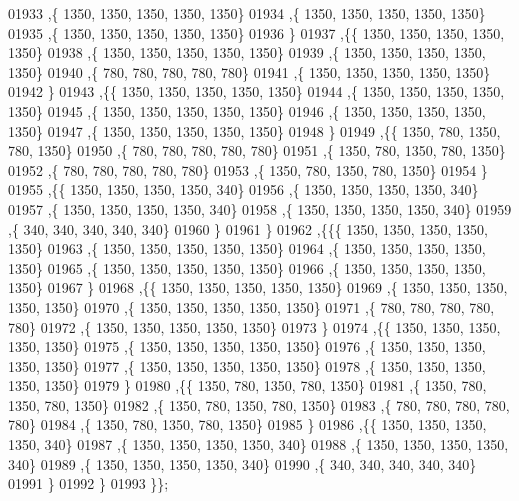 \begin{DoxyCode}
01933    ,\{  1350,  1350,  1350,  1350,  1350\}
01934    ,\{  1350,  1350,  1350,  1350,  1350\}
01935    ,\{  1350,  1350,  1350,  1350,  1350\}
01936    \}
01937   ,\{\{  1350,  1350,  1350,  1350,  1350\}
01938    ,\{  1350,  1350,  1350,  1350,  1350\}
01939    ,\{  1350,  1350,  1350,  1350,  1350\}
01940    ,\{   780,   780,   780,   780,   780\}
01941    ,\{  1350,  1350,  1350,  1350,  1350\}
01942    \}
01943   ,\{\{  1350,  1350,  1350,  1350,  1350\}
01944    ,\{  1350,  1350,  1350,  1350,  1350\}
01945    ,\{  1350,  1350,  1350,  1350,  1350\}
01946    ,\{  1350,  1350,  1350,  1350,  1350\}
01947    ,\{  1350,  1350,  1350,  1350,  1350\}
01948    \}
01949   ,\{\{  1350,   780,  1350,   780,  1350\}
01950    ,\{   780,   780,   780,   780,   780\}
01951    ,\{  1350,   780,  1350,   780,  1350\}
01952    ,\{   780,   780,   780,   780,   780\}
01953    ,\{  1350,   780,  1350,   780,  1350\}
01954    \}
01955   ,\{\{  1350,  1350,  1350,  1350,   340\}
01956    ,\{  1350,  1350,  1350,  1350,   340\}
01957    ,\{  1350,  1350,  1350,  1350,   340\}
01958    ,\{  1350,  1350,  1350,  1350,   340\}
01959    ,\{   340,   340,   340,   340,   340\}
01960    \}
01961   \}
01962  ,\{\{\{  1350,  1350,  1350,  1350,  1350\}
01963    ,\{  1350,  1350,  1350,  1350,  1350\}
01964    ,\{  1350,  1350,  1350,  1350,  1350\}
01965    ,\{  1350,  1350,  1350,  1350,  1350\}
01966    ,\{  1350,  1350,  1350,  1350,  1350\}
01967    \}
01968   ,\{\{  1350,  1350,  1350,  1350,  1350\}
01969    ,\{  1350,  1350,  1350,  1350,  1350\}
01970    ,\{  1350,  1350,  1350,  1350,  1350\}
01971    ,\{   780,   780,   780,   780,   780\}
01972    ,\{  1350,  1350,  1350,  1350,  1350\}
01973    \}
01974   ,\{\{  1350,  1350,  1350,  1350,  1350\}
01975    ,\{  1350,  1350,  1350,  1350,  1350\}
01976    ,\{  1350,  1350,  1350,  1350,  1350\}
01977    ,\{  1350,  1350,  1350,  1350,  1350\}
01978    ,\{  1350,  1350,  1350,  1350,  1350\}
01979    \}
01980   ,\{\{  1350,   780,  1350,   780,  1350\}
01981    ,\{  1350,   780,  1350,   780,  1350\}
01982    ,\{  1350,   780,  1350,   780,  1350\}
01983    ,\{   780,   780,   780,   780,   780\}
01984    ,\{  1350,   780,  1350,   780,  1350\}
01985    \}
01986   ,\{\{  1350,  1350,  1350,  1350,   340\}
01987    ,\{  1350,  1350,  1350,  1350,   340\}
01988    ,\{  1350,  1350,  1350,  1350,   340\}
01989    ,\{  1350,  1350,  1350,  1350,   340\}
01990    ,\{   340,   340,   340,   340,   340\}
01991    \}
01992   \}
01993  \}\};
\end{DoxyCode}
